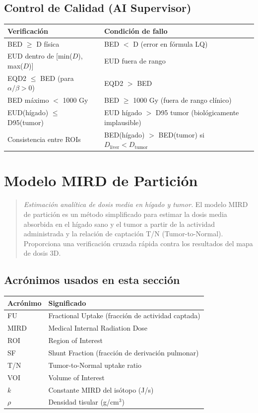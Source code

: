 \documentclass[12pt,a4paper]{article}
\begin{document}
\subsection*{Control de Calidad (AI Supervisor)}

\begin{tabular}{p{5cm} p{10cm}}
\toprule
\textbf{Verificación} & \textbf{Condición de fallo} \\
\midrule
BED $\geq$ D física & BED $<$ D (error en fórmula LQ) \\
EUD dentro de [min($D$), max($D$)] & EUD fuera de rango \\
EQD2 $\leq$ BED (para $\alpha/\beta > 0$) & EQD2 $>$ BED \\
BED máximo $<$ 1000 Gy & BED $\geq$ 1000 Gy (fuera de rango clínico) \\
EUD(hígado) $\leq$ D95(tumor) & EUD hígado $>$ D95 tumor (biológicamente implausible) \\
Consistencia entre ROIs & BED(hígado) $>$ BED(tumor) si $D_{\text{liver}} < D_{\text{tumor}}$ \\
\bottomrule
\end{tabular}

\newpage

\section{Modelo MIRD de Partición}

\begin{quote}
\textit{Estimación analítica de dosis media en hígado y tumor.} El modelo MIRD de partición es un método simplificado para estimar la dosis media absorbida en el hígado sano y el tumor a partir de la actividad administrada y la relación de captación T/N (Tumor-to-Normal). Proporciona una verificación cruzada rápida contra los resultados del mapa de dosis 3D.
\end{quote}

\subsection*{Acrónimos usados en esta sección}

\begin{tabular}{p{3cm} p{12cm}}
\toprule
\textbf{Acrónimo} & \textbf{Significado} \\
\midrule
FU & Fractional Uptake (fracción de actividad captada) \\
MIRD & Medical Internal Radiation Dose \\
ROI & Region of Interest \\
SF & Shunt Fraction (fracción de derivación pulmonar) \\
T/N & Tumor-to-Normal uptake ratio \\
VOI & Volume of Interest \\
$k$ & Constante MIRD del isótopo (J/s) \\
$\rho$ & Densidad tisular (g/cm$^3$) \\
\bottomrule
\end{tabular}
\end{document}
